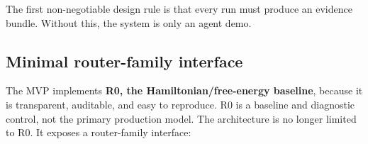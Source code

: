 The first non-negotiable design rule is that every run must produce an
evidence bundle. Without this, the system is only an agent demo.

\begin{Shaded}
\begin{Highlighting}[]
    \NormalTok{: }
 \OperatorTok{|}  \OperatorTok{=} 
\NormalTok{[}\NormalTok{] }\OperatorTok{=}\NormalTok{ []}
\NormalTok{    risk: Literal[}\NormalTok{, }\NormalTok{, }\NormalTok{] }\OperatorTok{=} 
 \OperatorTok{=} 
\NormalTok{[}\NormalTok{] }\OperatorTok{=}\NormalTok{ \{}
        \NormalTok{, }\NormalTok{,}
        \NormalTok{, }
\NormalTok{    \}}

\NormalTok{[}\NormalTok{]}
\NormalTok{[}\NormalTok{]}
\NormalTok{[TraceEvent]}
\NormalTok{[}\NormalTok{] }\OperatorTok{=}\NormalTok{ []}
 \OperatorTok{=}\NormalTok{ \{\}}
\end{Highlighting}
\end{Shaded}

\subsection{Minimal router-family
interface}\label{minimal-router-family-interface}

The MVP implements \textbf{R0, the Hamiltonian/free-energy baseline},
because it is transparent, auditable, and easy to reproduce. R0 is a
baseline and diagnostic control, not the primary production model. The
architecture is no longer limited to R0. It exposes a router-family
interface:


